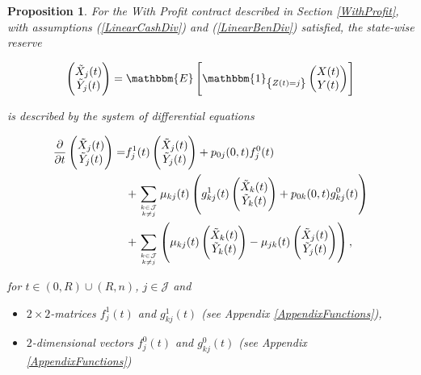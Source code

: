\documentclass{article}
\newcommand{\1}[1]{\mathbbm{1}_{\left\lbrace #1 \right\rbrace}}
\newcommand{\expec}[1][def]{\mathbbm{E} \left[ #1 \right]}
\theoremstyle{break}
\newtheorem{proposition}[definition]{Proposition}%
\theoremstyle{remark}
\numberwithin{equation}{section}
\begin{document}
\begin{proposition} \label{WPMainResult}
For the With Profit contract described in Section \ref{WithProfit}, with assumptions (\ref{LinearCashDiv}) and (\ref{LinearBenDiv}) satisfied, the state-wise reserve

\begin{align*}
\begin{pmatrix}\tilde{X}_j(t) \\ \tilde{Y}_j(t)\end{pmatrix} = \expec[\1{Z(t)=j}\begin{pmatrix}X(t) \\ Y(t)\end{pmatrix}]
\end{align*}

is described by the system of differential equations

\begin{align*}
\frac{\partial}{\partial t} \begin{pmatrix}\tilde{X}_j(t) \\ \tilde{Y}_j(t)\end{pmatrix} =& f_j^1(t) \begin{pmatrix}\tilde{X}_j(t) \\ \tilde{Y}_j(t)\end{pmatrix} + p_{0j}(0,t) f_j^0(t) \\
&+ \sum_{k \in \mathcal{J} \atop k \neq j} \mu_{kj}(t) \left( g_{kj}^1(t) \begin{pmatrix}\tilde{X}_k(t) \\ \tilde{Y}_k(t)\end{pmatrix} + p_{0k}(0,t) g_{kj}^0(t) \right) \\
&+ \sum_{k \in \mathcal{J} \atop k \neq j} \left( \mu_{kj}(t) \begin{pmatrix}\tilde{X}_k(t) \\ \tilde{Y}_k(t)\end{pmatrix} - \mu_{jk}(t) \begin{pmatrix}\tilde{X}_j(t) \\ \tilde{Y}_j(t)\end{pmatrix} \right),
\end{align*}

for $t \in (0,R)\cup(R,n)$, $j \in \mathcal{J}$ and

\begin{itemize}
	\item $2 \times 2$-matrices $f_j^1(t)$ and $g_{kj}^1(t)$ (see Appendix \ref{AppendixFunctions}),
	\item $2$-dimensional vectors $f_j^0(t)$ and $g_{kj}^0(t)$ (see Appendix \ref{AppendixFunctions})
\end{itemize}


\end{proposition}
\end{document}
